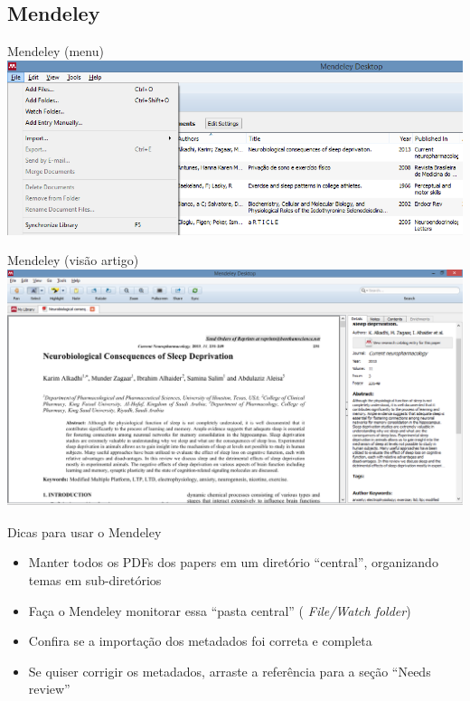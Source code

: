 \documentclass{beamer}
\begin{document}
\subsection{Mendeley}

\begin{frame}{Mendeley (menu)}
  \includegraphics[width=1.2\textwidth]{Referencias/mendeley-menu}
\end{frame}

\begin{frame}{Mendeley (visão artigo)}
  \includegraphics[width=1.2\textwidth]{Referencias/mendeley-artigo}
\end{frame}

\begin{frame}{Dicas para usar o Mendeley}
  \begin{itemize}
  \item Manter \alert{todos} os PDFs dos papers em um diretório
    ``central'', organizando temas em sub-diretórios
  \item Faça o Mendeley \alert{monitorar} essa ``pasta central'' ({\em
      File/Watch folder})
  \item Confira se a importação dos metadados foi correta e completa
  \item Se quiser corrigir os metadados, arraste a referência para a
    seção ``Needs review''
  \end{itemize}
\end{frame}
\end{document}
